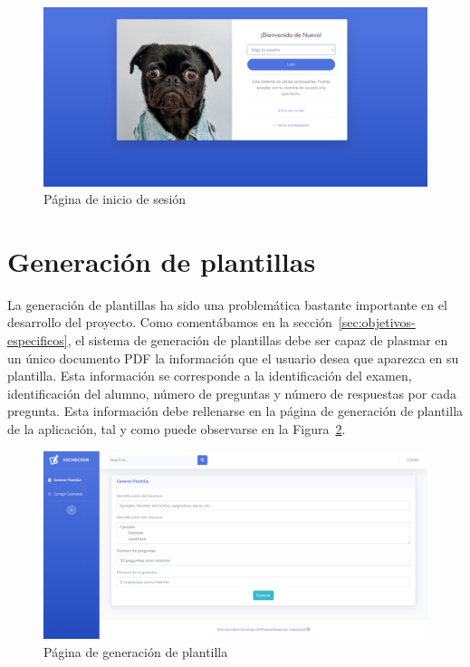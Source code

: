 \documentclass[a4paper, 12pt]{book}
\begin{document}
\begin{figure}
  \centering
  \includegraphics[width=12cm, keepaspectratio]{img/login}
  \caption{Página de inicio de sesión}
  \label{figura:login}
\end{figure}

\section{Generación de plantillas} 
\label{sec:generacion_plantillas}

La generación de plantillas ha sido una problemática bastante importante
en el desarrollo del proyecto. Como comentábamos en la 
sección~\ref{sec:objetivos-especificos}, el sistema de generación de
plantillas debe ser capaz de plasmar en un único documento PDF la
información que el usuario desea que aparezca en su plantilla. Esta
información se corresponde a la identificación del examen, identificación
del alumno, número de preguntas y número de respuestas por cada pregunta.
Esta información debe rellenarse en la página de generación de plantilla
de la aplicación, tal y como puede observarse en la
Figura~\ref{figura:generacion_plantilla}.

\begin{figure}
  \centering
  \includegraphics[width=12cm, keepaspectratio]{img/generacion_plantilla}
  \caption{Página de generación de plantilla}
  \label{figura:generacion_plantilla}
\end{figure}
\end{document}

